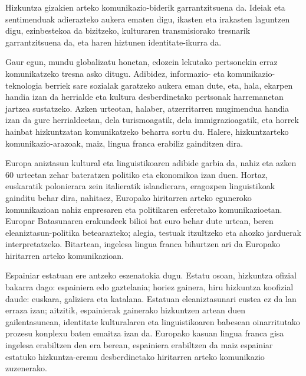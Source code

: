 \begin{multicols}{2}
Hizkuntza gizakien arteko komunikazio-biderik garrantzitsuena da. Ideiak eta sentimenduak adierazteko aukera ematen digu, ikasten eta irakasten laguntzen digu, ezinbestekoa da bizitzeko, kulturaren transmisiorako tresnarik garrantzitsuena da, eta haren hiztunen identitate-ikurra da.


Gaur egun, mundu globalizatu honetan, edozein lekutako pertsonekin erraz komunikatzeko tresna asko ditugu. Adibidez, informazio- eta komunikazio-teknologia berriek sare sozialak garatzeko aukera eman dute, eta, hala, ekarpen handia izan da herrialde eta kultura desberdinetako pertsonak harremanetan jartzea sustatzeko. Azken urteotan, halaber, atzerritarren mugimendua handia izan da gure herrialdeetan, dela turismoagatik, dela immigrazioagatik, eta horrek hainbat hizkuntzatan komunikatzeko beharra sortu du. Halere, hizkuntzarteko komunikazio-arazoak, maiz, lingua franca erabiliz gainditzen dira.

Europa aniztasun kultural eta linguistikoaren adibide garbia da, nahiz eta azken 60 urteetan zehar bateratzen politiko eta ekonomikoa izan duen. Hortaz, euskaratik polonierara zein italieratik islandierara, eragozpen linguistikoak gainditu behar dira, nahitaez, Europako hiritarren arteko eguneroko komunikazioan nahiz enpresaren eta politikaren esferetako komunikazioetan. Europar Batasunaren erakundeek bilioi bat euro behar dute urtean, beren eleaniztasun-politika betearazteko; alegia, testuak itzultzeko eta ahozko jarduerak interpretatzeko. Bitartean, ingelesa lingua franca bihurtzen ari da Europako hiritarren arteko komunikazioan.

Espainiar estatuan ere antzeko eszenatokia dugu. Estatu osoan, hizkuntza ofizial bakarra dago: espainiera edo gaztelania; horiez gainera, hiru hizkuntza koofizial daude: euskara, galiziera eta katalana. Estatuan eleaniztasunari eustea ez da lan erraza izan; aitzitik, espainierak gainerako hizkuntzen artean duen gailentasunean, identitate kulturalaren eta linguistikoaren babesean oinarritutako prozesu konplexu baten emaitza izan da. Europako kasuan lingua franca gisa ingelesa erabiltzen den era berean, espainiera erabiltzen da maiz espainiar estatuko hizkuntza-eremu desberdinetako hiritarren arteko komunikazio zuzenerako.   

 

\end{multicols}
